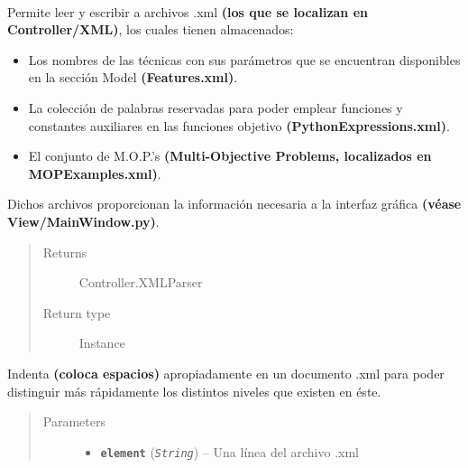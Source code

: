 \documentclass[letterpaper,10pt,english]{sphinxmanual}
\begin{document}
\begin{fulllineitems}
\label{Controller/XMLParser:Controller.XMLParser.XMLParser}~
\begin{DUlineblock}{0em}
\item[] Permite leer y escribir a archivos .xml \textbf{(los que se localizan en Controller/XML)}, 
los cuales tienen almacenados: 
\end{DUlineblock}
\begin{itemize}
\item {} 
Los nombres de las técnicas con sus parámetros que se encuentran disponibles en la sección Model \textbf{(Features.xml)}.

\item {} 
La colección de palabras reservadas para poder emplear funciones y constantes auxiliares en las funciones objetivo \textbf{(PythonExpressions.xml)}.

\item {} 
El conjunto de M.O.P.'s \textbf{(Multi-Objective Problems, localizados en MOPExamples.xml)}.

\end{itemize}

\begin{DUlineblock}{0em}
\item[] 
\item[] Dichos archivos proporcionan la información necesaria a la interfaz gráfica \textbf{(véase View/MainWindow.py)}.
\end{DUlineblock}
\begin{quote}\begin{description}
\item[{Returns}] \leavevmode
Controller.XMLParser

\item[{Return type}] \leavevmode
Instance

\end{description}\end{quote}

\begin{fulllineitems}
\label{Controller/XMLParser:Controller.XMLParser.XMLParser.indent}
Indenta \textbf{(coloca espacios)} apropiadamente
en un documento .xml para poder distinguir más
rápidamente los distintos niveles que existen en éste.
\begin{quote}\begin{description}
\item[{Parameters}] \leavevmode\begin{itemize}
\item {} 
\textbf{\texttt{element}} (\emph{\texttt{String}}) -- Una línea del archivo .xml


\end{itemize}
\end{description}
\end{quote}
\end{fulllineitems}
\end{fulllineitems}
\end{document}
